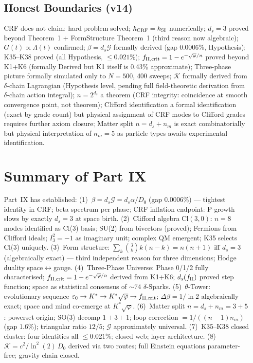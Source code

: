 \documentclass[12pt, a4paper]{article}
\begin{document}
\subsection{Honest Boundaries (v14)}

CRF does not claim: hard problem solved; $\hbar_{\rm CRF}=\hbar_{\rm SI}$ numerically;
$d_s=3$ proved beyond Theorem~1 + FormStructure Theorem~1 (third reason now algebraic);
$G(t)\propto\Lambda(t)$ confirmed; $\beta=d_s\mathcal{G}$ formally derived (gap 0.0006\%, Hypothesis);
K35--K38 proved (all Hypothesis, $\leq 0.021\%$); $f_{\rm II,crit}=1-e^{-\sqrt{\varphi}/n}$
proved beyond K1+K6 (formally Derived but K1 itself is 0.43\% approximate);
Three-phase picture formally simulated only to $N=500$, 400 sweeps; $\mathcal{K}$ formally
derived from $\delta$-chain Lagrangian (Hypothesis level, pending full field-theoretic derivation
from $\delta$-chain action integral); $n=2^{d_s}$ a theorem (CRF integrity: coincidence at smooth
convergence point, not theorem); Clifford identification a formal identification (exact by grade
count) but physical assignment of CRF modes to Clifford grades requires further axiom closure;
Matter split $n=d_s+n_m$ is exact combinatorially but physical interpretation of $n_m=5$ as
particle types awaits experimental identification.

\section{Summary of Part IX}

Part~IX has established:
(1)~$\beta = d_s\mathcal{G} = d_s\alpha/D_0$ (gap 0.0006\%) --- tightest identity in CRF;
beta spectrum per phase; CRF inflation endpoint: P-growth slows by exactly $d_s=3$ at space birth.
(2)~Clifford algebra $\mathrm{Cl}(3,0)$: $n=8$ modes identified as Cl(3) basis; SU(2) from
bivectors (proved); Fermions from Clifford ideals; $I_3^2=-1$ as imaginary unit; complex QM
emergent; K35 selects Cl(3) uniquely.
(3)~Form structure: $\sum_k\binom{3}{k}k(n-k)=n(n+1)$ iff $d_s=3$ (algebraically exact) ---
third independent reason for three dimensions; Hodge duality space$\leftrightarrow$gauge.
(4)~Three-Phase Universe: Phase 0/1/2 fully characterised; $f_{\rm II,crit}=1-e^{-\sqrt{\varphi}/n}$
derived from K1+K6; $d_s(f_{\rm II})$ proved step function; space as statistical consensus
of $\sim 74$ $\delta$-Sparks.
(5)~$\theta$-Tower: evolutionary sequence $\varepsilon_0\to K^*\to K^*\sqrt{\varphi}\to f_{\rm II,crit}$;
$\Delta\beta=1/\ln 2$ algebraically exact; space and mind co-emerge at $K^*\sqrt{\varphi}$.
(6)~Matter split $n=d_s+n_m=3+5$: powerset origin; SO(3) decomp $1+3+1$; loop correction
$=1/((n-1)n_m)$ (gap 1.6\%); triangular ratio $12/5$; $\mathcal{G}$ approximately universal.
(7)~K35--K38 closed cluster: four identities all $\leq 0.021\%$; closed web; layer architecture.
(8)~$\mathcal{K}=c^2/\ln^2(2)\,D_0$ derived via two routes; full Einstein equations parameter-free;
gravity chain closed.
\end{document}
